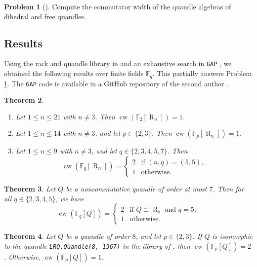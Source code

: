 \documentclass[12 pt]{amsart}
\newtheorem{theorem}{Theorem}[section]
\theoremstyle{definition}
\newtheorem{problem}[theorem]{Problem}
\theoremstyle{remark}
\numberwithin{equation}{section}
\newcommand{\cw}{\operatorname{cw}}
\newcommand{\R}{\operatorname{R}}
\newcommand{\F}{\mathbb F}
\begin{document}
\begin{problem}[{\cite[Prob.\ 7.5]{BPS-1}}]\label{prob:cw}
Compute the commutator width of the quandle algebras of dihedral and free quandles.
\end{problem}

\subsection{Results}
Using the rack and quandle library in \cite{VY} and an exhaustive search in \texttt{GAP} \cite{GAP4}, we obtained the following results over finite fields $\F_q$. This partially answers Problem \ref{prob:cw}. The \texttt{GAP} code is available in a GitHub repository of the second author \cite{GitHub}.

\begin{theorem}\label{Thm:cw-R_n}
    \phantom{-}
    \begin{enumerate}
        \item Let $1\leq n\leq 21$ with $n\neq 3$. Then $\cw(\F_2[\R_n])=1$.
        \item Let $1\leq n\leq 14$ with $n\neq 3$, and let $p\in\{2,3\}$. Then $\cw(\F_p[\R_n])=1$.
        \item Let $1\leq n\leq 9$ with $n\neq 3$, and let $q\in\{2,3,4,5,7\}$. Then
        \[
        \cw(\F_q[\R_n])=\begin{cases}
            2 &\text{if }(n,q)=(5,5),\\
            1&\text{otherwise.}
        \end{cases}
        \]
    \end{enumerate}
\end{theorem}

\begin{theorem}\label{Thm: cw-Q}
    Let $Q$ be a noncommutative quandle of order at most $7$. Then for all $q\in\{2,3,4,5\}$, we have
    \[
    \cw(\F_q[Q])=\begin{cases}
        2&\text{if }Q\cong\R_5\text{ and }q=5,\\
        1&\text{otherwise.}
    \end{cases}
    \]
\end{theorem}

\begin{theorem}\label{thm:cw-8}
    Let $Q$ be a quandle of order $8$, and let $p\in\{2,3\}$. If $Q$ is isomorphic to the quandle \texttt{LRQ.Quandle(8, 1367)} in the library of \cite{VY}, then $\cw(\F_p[Q])=2$. Otherwise, $\cw(\F_p[Q])=1$.
\end{theorem}
\end{document}
